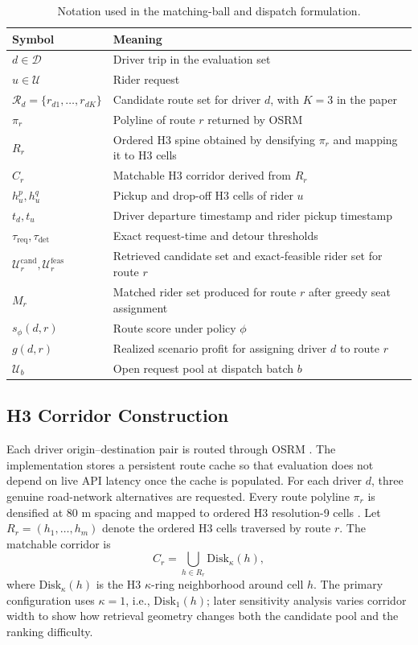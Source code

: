 \documentclass[journal]{IEEEtran}
\begin{document}
\begin{table}[!t]
\caption{Notation used in the matching-ball and dispatch formulation.}
\label{tab:notation}
\centering
\footnotesize
\begin{tabularx}{\columnwidth}{|L{0.30\columnwidth}|Y|}
\hline
Symbol & Meaning \\
\hline
\(d \in \mathcal{D}\) & Driver trip in the evaluation set \\
\hline
\(u \in \mathcal{U}\) & Rider request \\
\hline
\(\mathcal{R}_d=\{r_{d1},\dots,r_{dK}\}\) & Candidate route set for driver \(d\), with \(K=3\) in the paper \\
\hline
\(\pi_r\) & Polyline of route \(r\) returned by OSRM \\
\hline
\(R_r\) & Ordered H3 spine obtained by densifying \(\pi_r\) and mapping it to H3 cells \\
\hline
\(C_r\) & Matchable H3 corridor derived from \(R_r\) \\
\hline
\(h_u^{p}, h_u^{q}\) & Pickup and drop-off H3 cells of rider \(u\) \\
\hline
\(t_d, t_u\) & Driver departure timestamp and rider pickup timestamp \\
\hline
\(\tau_{\mathrm{req}}, \tau_{\mathrm{det}}\) & Exact request-time and detour thresholds \\
\hline
\(\mathcal{U}_r^{\mathrm{cand}}, \mathcal{U}_r^{\mathrm{feas}}\) & Retrieved candidate set and exact-feasible rider set for route \(r\) \\
\hline
\(M_r\) & Matched rider set produced for route \(r\) after greedy seat assignment \\
\hline
\(s_\phi(d,r)\) & Route score under policy \(\phi\) \\
\hline
\(g(d,r)\) & Realized scenario profit for assigning driver \(d\) to route \(r\) \\
\hline
\(\mathcal{U}_b\) & Open request pool at dispatch batch \(b\) \\
\hline
\end{tabularx}
\end{table}

\subsection{H3 Corridor Construction}
Each driver origin--destination pair is routed through OSRM \cite{osrmapi}. The implementation stores a persistent route cache so that evaluation does not depend on live API latency once the cache is populated. For each driver \(d\), three genuine road-network alternatives are requested. Every route polyline \(\pi_r\) is densified at 80 m spacing and mapped to ordered H3 resolution-9 cells \cite{h3docs}. Let \(R_r=(h_1,\dots,h_m)\) denote the ordered H3 cells traversed by route \(r\). The matchable corridor is
\[
C_r=\bigcup_{h\in R_r}\mathrm{Disk}_{\kappa}(h),
\]
where \(\mathrm{Disk}_{\kappa}(h)\) is the H3 \(\kappa\)-ring neighborhood around cell \(h\). The primary configuration uses \(\kappa=1\), i.e., \(\mathrm{Disk}_1(h)\); later sensitivity analysis varies corridor width to show how retrieval geometry changes both the candidate pool and the ranking difficulty.
\end{document}
